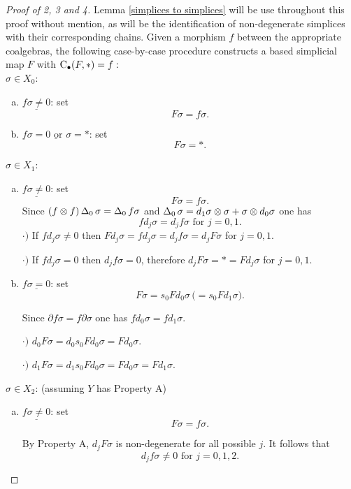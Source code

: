 \documentclass[main.tex]{subfiles}
\begin{document}
\begin{proof}[Proof of 2, 3 and 4]
Lemma \ref{simplices to simplices} will be use throughout this proof without mention, as will be the identification of non-degenerate simplices with their corresponding chains. Given a morphism $f$ between the appropriate coalgebras, the following case-by-case procedure constructs a based simplicial map $F$ with $\operatorname{C_{\bullet}}(F,\ast)=f:$ \hfill \vspace*{5pt}\\
$\sigma\in X_0$:
    \begin{enumerate}[a)]
    \item $\underline{f\sigma\neq0}$: set $$F\sigma=f\sigma.$$
    \item $\underline{f\sigma=0 \text{ or } \sigma=\ast}$: set $$F\sigma=\ast.$$
    \end{enumerate}
$\sigma\in X_1$:
    \begin{enumerate}[a)]
    \item $\underline{f\sigma\neq0}$: set $$F\sigma=f\sigma.$$
    Since $(f\otimes f)\operatorname{\Delta}_0\sigma=\operatorname{\Delta}_0f\sigma$ and $\operatorname{\Delta}_0\sigma = d_1\sigma\otimes \sigma+\sigma\otimes d_0\sigma$ one has
    $$fd_j\sigma=d_jf\sigma\text{ for }j=0,1.$$
    $\cdot)$ If $fd_j\sigma\neq0$ then $Fd_j\sigma=fd_j\sigma=d_jf\sigma=d_jF\sigma$ for $j=0,1$.\par

    $\cdot)$ If $fd_j\sigma=0$ then $d_jf\sigma=0$, therefore $d_jF\sigma=\ast=Fd_j\sigma$ for $j=0,1$.\par

    \item $\underline{f\sigma=0}$: set $$F\sigma=s_0Fd_0\sigma \, \big(=s_0Fd_1\sigma\big).$$

        Since $\partial f\sigma = f\partial\sigma$ one has $fd_0\sigma = fd_1\sigma$.\par

        $\cdot)$ $d_0F\sigma=d_0s_0Fd_0\sigma=Fd_0\sigma$.\par

        $\cdot)$ $d_1F\sigma=d_1s_0Fd_0\sigma=Fd_0\sigma=Fd_1\sigma$.
    \end{enumerate}
$\sigma\in X_2$: (assuming $Y$ has Property A) \par
    \begin{enumerate}[a)]
    \item $\underline{f\sigma\neq0}$: set $$F\sigma=f\sigma.$$

    By Property A, $d_jF\sigma$ is non-degenerate for all possible $j$. It follows that $$d_jf\sigma\neq0\text{ for }j=0,1,2.$$


\end{enumerate}
\end{proof}
\end{document}
